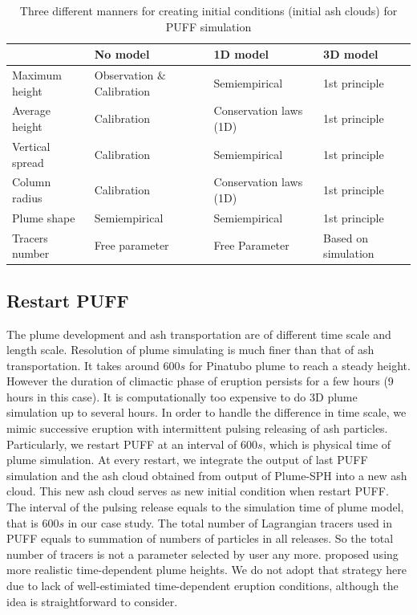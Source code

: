 \begin{table}
\centering
      \caption{Three different manners for creating initial conditions (initial ash clouds) for PUFF simulation}		
	  \begin{tabular}{p{33mm}p{32mm}p{32mm}p{32mm}}
	    \hline
	    		 & No model & 1D model & 3D model \\
	    		 \hline    		 
	  Maximum height & Observation $\&$ \newline Calibration & Semiempirical &  1st principle \\
	  Average height &  Calibration & Conservation \newline laws (1D) &  1st principle  \\
	  Vertical spread &  Calibration & Semiempirical & 1st principle \\
	  Column radius & Calibration  &  Conservation \newline laws (1D) &  1st principle \\
	  Plume shape & Semiempirical & Semiempirical  & 1st principle \\
	  Tracers number & Free \newline parameter  & Free \newline Parameter & Based on \newline simulation\\ 
	    \hline
	  \end{tabular}
	  \label{tab:VATDs-source-term-determination}
\end{table}

\subsection{Restart PUFF}

The plume development and ash transportation are of different time scale and length scale. Resolution of plume simulating is much finer than that of ash transportation.
It takes around $600 s$ for Pinatubo plume to reach a steady height. However the duration of climactic phase of eruption persists for a few hours (9 hours in this case). It is computationally too expensive to do 3D plume simulation up to several hours. In order to handle the difference in time scale, we mimic successive eruption with intermittent pulsing releasing of ash particles. Particularly, we restart PUFF at an interval of $600 s$, which is physical time of plume simulation. At every restart, we integrate the output of last PUFF simulation and the ash cloud obtained from output of Plume-SPH into a new ash cloud. This new ash cloud serves as new initial condition when restart PUFF. The interval of the pulsing release equals to the simulation time of plume model, that is $600 s$ in our case study. The total number of Lagrangian tracers used in PUFF equals to summation of numbers of particles in all releases. So the total number of tracers is not a parameter selected by user any more.
\citet{fero2008simulation} proposed using more realistic time-dependent plume heights. We do not adopt that strategy here due to lack of well-estimiated time-dependent eruption conditions, although the idea is straightforward to consider.

